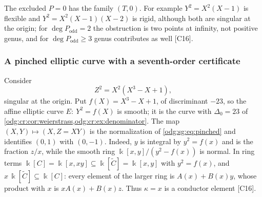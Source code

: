 \documentclass[11pt,oneside]{article}
\numberwithin{equation}{section}
\theoremstyle{definition}
\theoremstyle{remark}
\newcommand{\src}[1]{\textup{\textsf{\small[#1]}}}
\begin{document}
The excluded $P=0$ has the family $(T,0)$. For example $Y^2=X^2(X-1)$ is flexible and
$Y^2=X^2(X-1)(X-2)$ is rigid, although both are singular at the origin; for
$\deg P_{\mathrm{odd}}=2$ the obstruction is two points at infinity, not positive genus, and
for $\deg P_{\mathrm{odd}}\ge3$ genus contributes as well \src{C16}.

\subsubsection{A pinched elliptic curve with a seventh-order certificate}\label{odg:sg:sub:example}

Consider
\begin{equation}\label{odg:sg:eq:pinched}
 Z^2=X^2(X^3-X+1),
\end{equation}
singular at the origin. Put $f(X)=X^3-X+1$, of discriminant $-23$, so the affine elliptic
curve $E:\ Y^2=f(X)$ is smooth; it is the curve with $\Delta_0=23$ of
\cref{odg:cr:cor:weierstrass,odg:cr:ex:denominator}. The map $(X,Y)\mapsto(X,Z=XY)$ is the
normalization of \eqref{odg:sg:eq:pinched} and identifies $(0,1)$ with $(0,-1)$.
Indeed, $y$ is integral by $y^2=f(x)$ and is the fraction $z/x$, while the
smooth ring $\Bbbk[x,y]/(y^2-f(x))$ is normal. In ring
terms $\Bbbk[C]=\Bbbk[x,xy]\subseteq\Bbbk[\widetilde C]=\Bbbk[x,y]$ with $y^2=f(x)$, and
$x\,\Bbbk[\widetilde C]\subseteq\Bbbk[C]$: every element of the larger ring
is $A(x)+B(x)y$, whose product with $x$ is $xA(x)+B(x)z$. Thus
$\kappa=x$ is a conductor element \src{C16}.
\end{document}
